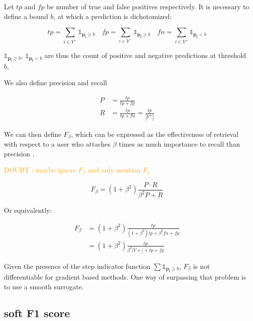 \documentclass[sigconf,natbib,screen=true,review=true,anonymous]{acmart}
\newcommand\doubt[1]{\textcolor{orange}{DOUBT : #1}}
\begin{document}
Let \(tp\) and \(fp\) be number of true and false positives respectively. It is necessary to define a bound \(b\), at which a prediction is dichotomized:

$$
 t p=\sum_{i \in Y^{+}} \mathds{1}_{\mathbf{p_i} \geq b} \quad f p=\sum_{i \in Y^{-}} \mathds{1}_{\mathbf{p_i} \geq b} \quad fn = \sum_{i \in Y^{+}} \mathds{1}_{\mathbf{p_i} < b}
 $$

\(\mathds{1}_{\mathbf{p_i} \geq b}\), \(\mathds{1}_{\mathbf{p_i} < b}\) are thus the count of positive and negative predictions at threshold \(b\), 

We also define precision and recall

\begin{equation}
\begin{aligned} P &=\frac{t p}{t p+f p} \\ R &=\frac{t p}{t p+f n}=\frac{t p}{\left|Y^{+}\right|} \end{aligned}
\end{equation}

We can then define \(F_\beta\), which can be expressed as the effectiveness of retrieval with respect to a user who attaches \(\beta\) times as much importance to recall than precision \cite{informationRetrieval}.

\doubt{maybe ignore $F_\beta$ and only mention $F_1$}

\begin{equation}
F_{\beta}=\left(1+\beta^{2}\right) \frac{P \cdot R}{\beta^{2} P+R}
\end{equation}

Or equivalently:

\begin{equation}
\begin{aligned} F_{\beta} &=\left(1+\beta^{2}\right) \frac{t p}{\left(1+\beta^{2}\right) t p+\beta^{2} f n+f p} \\ &=\left(1+\beta^{2}\right) \frac{t p}{\beta^{2}|Y+|+t p+f p} \end{aligned}
\end{equation}

Given the presence of the step indicator function \(\sum \mathds{1}_{\mathbf{p_i} \geq b}\), \(F_\beta\) is not differentiable for gradient based methods. One way of surpassing that problem is to use a smooth surrogate.

\subsection{soft F1 score}
\label{sec:orgf5227ab}
\end{document}
